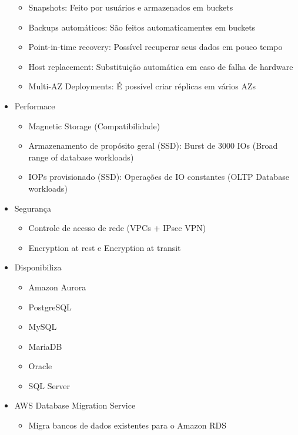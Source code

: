 \begin{frame}[allowframebreaks]
\begin{itemize}
\begin{itemize}
				\item Snapshots: Feito por usuários e armazenados em buckets
				\item Backups automáticos: São feitos automaticamentes em buckets
				\item Point-in-time recovery: Possível recuperar seus dados em pouco tempo
				\item Host replacement: Substituição automática em caso de falha de hardware
				\item Multi-AZ Deployments: É possível criar réplicas em vários AZs
			\end{itemize}
		\item Performace
			\begin{itemize}
				\item Magnetic Storage (Compatibilidade)
				\item Armazenamento de propósito geral (SSD): Burst de 3000 IOs (Broad range of database workloads)
				\item IOPs provisionado (SSD): Operações de IO constantes (OLTP Database workloads)
			\end{itemize}
		\item Segurança
			\begin{itemize}
				\item Controle de acesso de rede (VPCs + IPsec VPN)
				\item Encryption at rest e Encryption at transit
			\end{itemize}
	\end{itemize}
	\framebreak
	\begin{itemize}
		\item Disponibiliza
			\begin{multicols}{2}
			\begin{itemize}
				\item Amazon Aurora
				\item PostgreSQL
				\item MySQL
				\columnbreak
				\item MariaDB
				\item Oracle
				\item SQL Server
			\end{itemize}
			\end{multicols}
		\item AWS Database Migration Service
			\begin{itemize}
				\item Migra bancos de dados existentes para o Amazon RDS
			\end{itemize}
	\end{itemize}
\end{frame}
